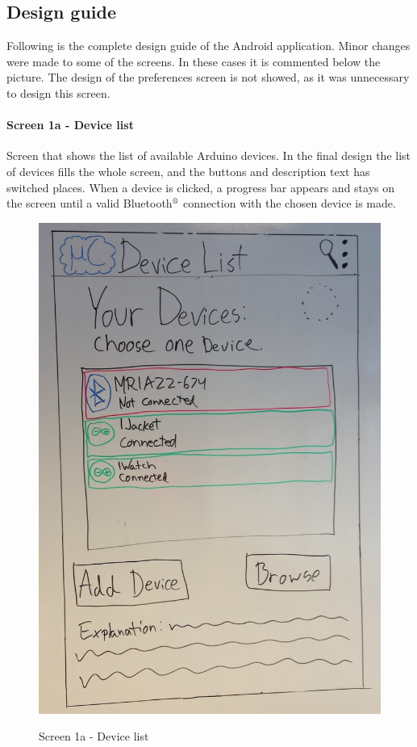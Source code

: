 \subsection{Design guide}
Following is the complete design guide of the Android application. Minor changes were made to some of the screens. In these cases it is commented below the picture. The design of the preferences screen is not showed, as it was unnecessary to design this screen.

\paragraph{Screen 1a - Device list}
Screen that shows the list of available Arduino devices. In the final design the list of devices fills the whole screen, and the buttons and description text has switched places. When a device is clicked, a progress bar appears and stays on the screen until a valid Bluetooth$\textsuperscript{\textregistered}$ connection with the chosen device is made.

\begin{figure}[H]
\includegraphics[scale=0.2]{images/Design_guide/Screen1a.png}
\label{fig:1a}
\caption{Screen 1a - Device list}
\centering
\end{figure}


